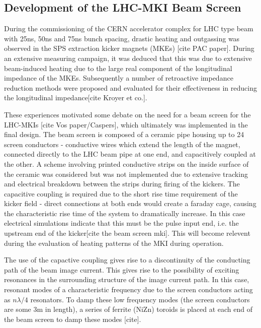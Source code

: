 \subsection{Development of the LHC-MKI Beam Screen}

During the commissioning of the CERN accelerator complex for LHC type beam with 25ns, 50ns and 75ns bunch spacing, drastic heating and outgassing was observed in the SPS extraction kicker magnets (MKEs) [cite PAC paper]. During an extensive measuring campaign, it was deduced that this was due to extensive beam-induced heating due to the large real component of the longitudinal impedance of the MKEs. Subsequently a number of retroactive impedance reduction methods were proposed and evaluated for their effectiveness in reducing the longitudinal impedance[cite Kroyer et co.].

These experiences motivated some debate on the need for a beam screen for the LHC-MKIs [cite Vos paper/Caspers], which ultimately was implemented in the final design. The beam screen is composed of a ceramic pipe housing up to 24 screen conductors - conductive wires which extend the length of the magnet, connected directly to the LHC beam pipe at one end, and capacitively coupled at the other. A scheme involving printed conductive strips on the inside surface of the ceramic was considered but was not implemented due to extensive tracking and electrical breakdown between the strips during firing of the kickers. The capacitive coupling is required due to the short rise time requirement of the kicker field - direct connections at both ends would create a faraday cage, causing the characteristic rise time of the system to dramatically increase. In this case electrical simulations indicate that this must be the pulse input end, i.e. the upstream end of the kicker[cite the beam screen mki]. This will become relevent during the evaluation of heating patterns of the MKI during operation.

The use of the capactive coupling gives rise to a discontinuity of the conducting path of the beam image current. This gives rise to the possibility of exciting resonances in the surrounding structure of the image current path. In this case, resonant modes of a characteristic frequency due to the screen conductors acting as $n \lambda /4$ resonators. To damp these low frequency modes (the screen conductors are some 3m in length), a series of ferrite (NiZn) toroids is placed at each end of the beam screen to damp these modes [cite]. 


